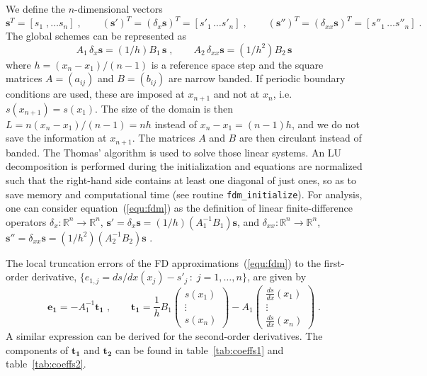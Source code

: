 We define the $n$-dimensional vectors
\begin{equation}
  \mathbf{s}^T=[s_1\;,\ldots s_n]\;,\qquad (\mathbf{s'})^T=(\delta_x \mathbf{s})^T=[s'_1\,\ldots s'_n]\;,\qquad (\mathbf{s''})^T=(\delta_{xx} \mathbf{s})^T=[s''_1\,\ldots s''_n] \;.
\end{equation}
The global schemes can be represented as
\begin{equation}
  A_1\, \delta_x \mathbf{s}=(1/h)B_1\, \mathbf{s} \;, \qquad
  A_2\, \delta_{xx} \mathbf{s}=(1/h^2)B_2\, \mathbf{s}
\label{equ:fdm}
\end{equation}
where $h=(x_n-x_1)/(n-1)$ is a reference space step and the square matrices $A=(a_{ij})$ and $B=(b_{ij})$ are narrow banded. If periodic boundary conditions are used, these are imposed at $x_{n+1}$ and not at $x_n$, i.e.  $s(x_{n+1})=s(x_1)$. The size of the domain is then $L=n(x_n-x_1)/(n-1)=nh$ instead of $x_n-x_1=(n-1)h$, and we do not save the information at $x_{n+1}$. The matrices $A$ and $B$ are then circulant instead of banded. The Thomas' algorithm is used to solve those linear systems. An LU decomposition is performed during the initialization and equations are normalized such that the right-hand side contains at least one diagonal of just ones, so as to save memory and computational time (see routine {\tt   fdm\_initialize}). For analysis, one can consider equation~(\ref{equ:fdm}) as the definition of linear finite-difference operators $\delta_x: \mathbb{R}^n \rightarrow \mathbb{R}^n$, $\mathbf{s'} = \delta_x\mathbf{s} = (1/h)(A_1^{-1}B_1)\mathbf{s}$, and $\delta_{xx}: \mathbb{R}^n \rightarrow \mathbb{R}^n$, $\mathbf{s''} = \delta_{xx}\mathbf{s} = (1/h^2)(A_2^{-1}B_2)\mathbf{s}$ \citep{Mellado:2012}.

The local truncation errors of the FD approximations~(\ref{equ:fdm}) to the first-order derivative, $\{e_{1,j}=ds/dx(x_j)-s'_j\,:\;j=1,\ldots,n\}$, are given by
\begin{equation}
  \mathbf{e_1} = -A_1^{-1}\mathbf{t_1}\;,\qquad
  \mathbf{t_1}=
  \frac{1}{h}B_1\left(\begin{array}{c}s(x_1)\\\vdots\\s(x_n)\end{array}\right)-
  A_1\left(
  \begin{array}{c}\frac{ds}{dx}(x_1)\\\vdots\\\frac{ds}{dx}(x_n)
  \end{array}\right)\;.
  \label{equ:truncation1}
\end{equation}
A similar expression can be derived for the second-order derivatives. The components of $\mathbf{t_1}$ and $\mathbf{t_2}$ can be found in table~\ref{tab:coeffs1} and table~\ref{tab:coeffs2}.


